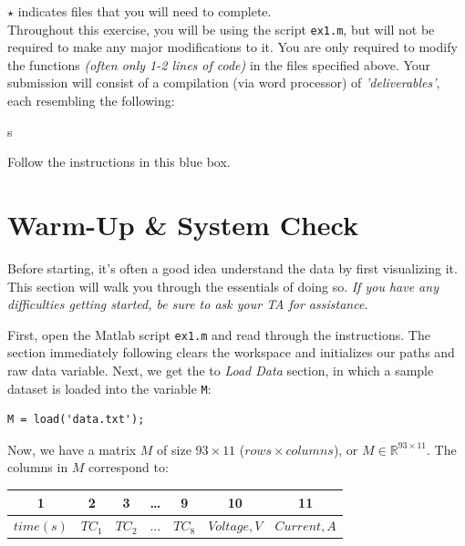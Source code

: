 \documentclass[11pt, letterpaper]{article}
\begin{document}
\noindent
$\star$ indicates files that you will need to complete.\\

\n
Throughout this exercise, you will be using the script \texttt{ex1.m}, but will not be required to make any major modifications to it. You are only required to modify the functions \textit{(often only 1-2 lines of code)} in the files specified above. Your submission will consist of a compilation (via word processor) of \textit{'deliverables'}, each resembling the following:
\setcounter{deliv}{-1}
\begin{formal}
    \begin{deliv} s
    
Follow the instructions in this blue box.
    \end{deliv}
\end{formal}


\setcounter{section}{-1}
\section{Warm-Up \& System Check}

Before starting, it's often a good idea understand the data by first visualizing it. This section will walk you through the essentials of doing so. \textit{If you have any difficulties getting started, be sure to ask your TA for assistance.} \n

\noindent
First, open the Matlab script \texttt{ex1.m} and read through the instructions. The section immediately following clears the workspace and initializes our paths and raw data variable. Next, we get the to \textit{Load Data} section, in which a sample dataset is loaded into the variable \texttt{M}:
\n
\begin{lstlisting}[numbers=none]
% load tab separated data
M = load('data.txt'); 
\end{lstlisting}
\n
Now, we have a matrix $M$ of size $93 \times 11$ ($rows \times columns$), or $M \in \mathbb{R}^{93 \times 11}$. The columns in $M$ correspond to:
\\
{\small
\begin{center}\renewcommand{\arraystretch}{1.5}
\begin{tabular}{|c | c | c | c | c | c | c |}
\hline
\rowcolor{light-gray}
    1 & 2 & 3 & \dots & 9 & 10 & 11 \\ 
    \hline
   \cellcolor{green!10} $time (s)$ & \cellcolor{red!10}$TC_1$ & \cellcolor{red!10}$TC_2$ & \cellcolor{red!10}$\dots$ & \cellcolor{red!10}$TC_8$ & \cellcolor{orange!10}$Voltage, V$ & \cellcolor{orange!10}$Current, A$ \\ 
\hline
\end{tabular}
\end{center}
}
\end{document}
